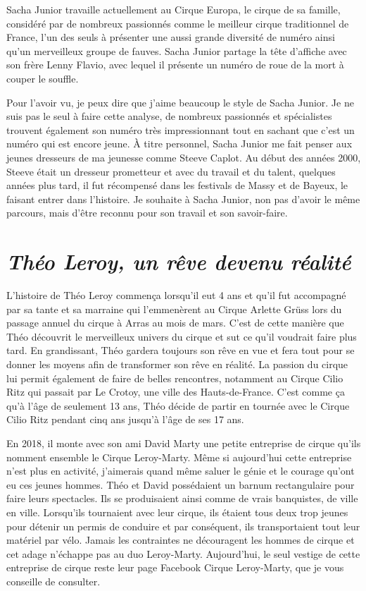 Sacha Junior travaille actuellement au Cirque Europa, le cirque de sa famille, considéré par de nombreux passionnés comme le meilleur cirque traditionnel de France, l'un des seuls à présenter une aussi grande diversité de numéro ainsi qu'un merveilleux groupe de fauves. Sacha Junior partage la tête d'affiche avec son frère Lenny Flavio, avec lequel il présente un numéro de roue de la mort à couper le souffle.

Pour l'avoir vu, je peux dire que j'aime beaucoup le style de Sacha Junior. Je ne suis pas le seul à faire cette analyse, de nombreux passionnés et spécialistes trouvent également son numéro très impressionnant tout en sachant que c'est un numéro qui est encore jeune. À titre personnel, Sacha Junior me fait penser aux jeunes dresseurs de ma jeunesse comme Steeve Caplot. Au début des années 2000, Steeve était un dresseur prometteur et avec du travail et du talent, quelques années plus tard, il fut récompensé dans les festivals de Massy et de Bayeux, le faisant entrer dans l'histoire. Je souhaite à Sacha Junior, non pas d'avoir le même parcours, mais d'être reconnu pour son travail et son savoir-faire. 

\section*{\textit{Théo Leroy, un rêve devenu réalité }}
{}

L'histoire de Théo Leroy commença lorsqu’il eut 4 ans et qu'il fut accompagné par sa tante et sa marraine qui l'emmenèrent au Cirque Arlette Grüss lors du passage annuel du cirque à Arras au mois de mars. C'est de cette manière que Théo découvrit le merveilleux univers du cirque et sut ce qu'il voudrait faire plus tard. En grandissant, Théo gardera toujours son rêve en vue et fera tout pour se donner les moyens afin de transformer son rêve en réalité. La passion du cirque lui permit également de faire de belles rencontres, notamment au Cirque Cilio Ritz qui passait par Le Crotoy, une ville des Hauts-de-France. C'est comme ça qu'à l'âge de seulement 13 ans, Théo décide de partir en tournée avec le Cirque Cilio Ritz pendant cinq ans jusqu'à l'âge de ses 17 ans.

En 2018, il monte avec son ami David Marty une petite entreprise de cirque qu'ils nomment ensemble le Cirque Leroy-Marty. Même si aujourd'hui cette entreprise n'est plus en activité, j'aimerais quand même saluer le génie et le courage qu'ont eu ces jeunes hommes. Théo et David possédaient un barnum rectangulaire pour faire leurs spectacles. Ils se produisaient ainsi comme de vrais banquistes, de ville en ville. Lorsqu'ils tournaient avec leur cirque, ils étaient tous deux trop jeunes pour détenir un permis de conduire et par conséquent, ils transportaient tout leur matériel par vélo. Jamais les contraintes ne découragent les hommes de cirque et cet adage n'échappe pas au duo Leroy-Marty. Aujourd'hui, le seul vestige de cette entreprise de cirque reste leur page Facebook Cirque Leroy-Marty, que je vous conseille de consulter.

